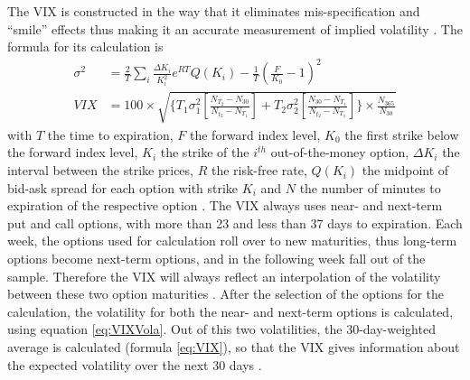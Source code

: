The \ac{VIX} is constructed in the way that it eliminates mis-specification and ``smile'' effects thus making it an accurate measurement of implied volatility \parencite{blair2001}. The formula for its calculation is
\begin{align}
\sigma^{2} &= \frac{2}{T} \sum_{i} \frac{\Delta K_{i}}{K_{i}^{2}} e^{RT} Q(K_{i}) - \frac{1}{T} (\frac{F}{K_{0}} - 1)^{2} \label{eq:VIXVola}\\
VIX &= 100 \times \sqrt{ \lbrace T_{1}\sigma^{2}_{1}[\frac{N_{T_{2}} - N_{30}}{N_{t_{2}}-N_{T_{1}}}] + T_{2}\sigma^{2}_{2}[\frac{N_{30} - N_{T_{1}}}{N_{t_{2}}-N_{T_{1}}}] \rbrace \times \frac{N_{365}}{N_{30}}} \label{eq:VIX}
\end{align}
with $T$ the time to expiration, $F$ the forward index level, $K_{0}$ the first strike below the forward index level, $K_{i}$ the strike of the $i^{th}$ out-of-the-money option, $\Delta K_{i}$ the interval between the strike prices, $R$ the risk-free rate, $Q(K_{i})$ the midpoint of bid-ask spread for each option with strike $K_{i}$ and $N$ the number of minutes to expiration of the respective option \parencite{exchange2009}. The \ac{VIX} always uses near- and next-term put and call options, with more than 23 and less than 37 days to expiration. Each week, the options used for calculation roll over to new maturities, thus long-term options become next-term options, and in the following week fall out of the sample. Therefore the \ac{VIX} will always reflect an interpolation of the volatility between these two option maturities \parencite{poon2003}. After the selection of the options for the calculation, the volatility for both the near- and next-term options is calculated, using equation \ref{eq:VIXVola}. Out of this two volatilities, the 30-day-weighted average is calculated (formula \ref{eq:VIX}), so that the \ac{VIX} gives information about the expected volatility over the next 30 days \parencite{exchange2009}. 






